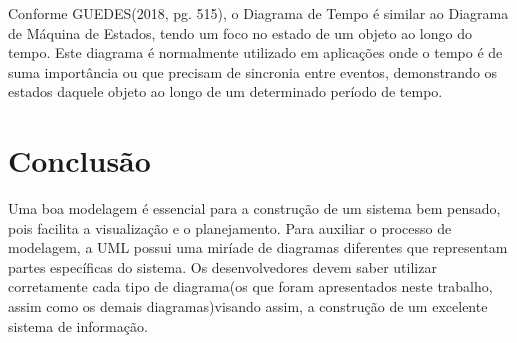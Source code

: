 \documentclass[12pt,openright,oneside,a4paper,
	chapter=TITLE,
	section=TITLE,
	english,brazil]{abntex2}
\begin{document}
Conforme GUEDES(2018, pg. 515), o Diagrama de Tempo é similar ao Diagrama de Máquina de Estados, tendo um foco no estado de um objeto ao longo do tempo. Este diagrama é normalmente utilizado em aplicações onde o tempo é de suma importância ou que precisam de sincronia entre eventos, demonstrando os estados daquele objeto ao longo de um determinado período de tempo.

\chapter{Conclusão}

Uma boa modelagem é essencial para a construção de um sistema bem pensado, pois facilita a visualização e o planejamento. Para auxiliar o processo de modelagem, a UML possui uma miríade de diagramas diferentes que representam partes específicas do sistema. Os desenvolvedores devem saber utilizar corretamente cada tipo de diagrama(os que foram apresentados neste trabalho, assim como os demais diagramas)visando assim, a construção de um excelente sistema de informação. 

\postextual


\nocite{GUEDES}
\nocite{BEZERRA}
\nocite{LARMAN}
\nocite{UML}
\end{document}

